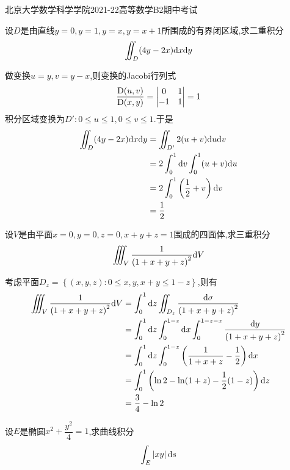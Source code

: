 \documentclass{ctexart}
\begin{document}
\pagestyle{empty}
\begin{center}\Large
    北京大学数学科学学院2021-22高等数学B2期中考试
\end{center}
\begin{problem}[1.(10\songti{分})]
    设$D$是由直线$y=0,y=1,y=x,y=x+1$所围成的有界闭区域,求二重积分
    \[\iint_D(4y-2x)\mathrm{d} x\mathrm{d} y\]

\end{problem}
\begin{solution}
    做变换$u=y,v=y-x$,则变换的Jacobi行列式
    \[\dfrac{\text D(u,v)}{\text D(x,y)}=\begin{vmatrix}
        0&1\\-1&1
    \end{vmatrix}=1\]
    积分区域变换为$D':0\leqslant u\leqslant 1,0\leqslant v\leqslant 1$.于是
    \[\begin{aligned}
        \iint_D(4y-2x)\mathrm{d} x\mathrm{d} y
        &= \iint_{D'}2(u+v)\mathrm{d} u\mathrm{d} v \\
        &= 2\int_0^1\mathrm{d} v\int_0^1(u+v)\mathrm{d} u \\
        &= 2\int_0^1\left(\dfrac12+v\right)\mathrm{d} v \\
        &= \dfrac12
    \end{aligned}\]
\end{solution}
\begin{problem}[2.(10\songti{分})]
    设$V$是由平面$x=0,y=0,z=0,x+y+z=1$围成的四面体,求三重积分
    \[\iiint_V\dfrac{1}{\left(1+x+y+z\right)^2}\mathrm{d} V\]
    
\end{problem}
\begin{solution}
    考虑平面$D_z=\left\{(x,y,z):0\leqslant x,y,x+y\leqslant 1-z\right\}$,则有
    \[\begin{aligned}
        \iiint_V\dfrac{1}{\left(1+x+y+z\right)^2}\mathrm{d} V
        &= \int_0^1\mathrm{d} z\iint_{D_z}\dfrac{\mathrm{d}\sigma}{\left(1+x+y+z\right)^2} \\
        &= \int_0^1\mathrm{d} z\int_0^{1-z}\mathrm{d} x\int_0^{1-z-x}\dfrac{\mathrm{d} y}{\left(1+x+y+z\right)^2} \\
        &= \int_0^1\mathrm{d} z\int_0^{1-z}\left(\dfrac{1}{1+x+z}-\dfrac12\right)\mathrm{d} x \\
        &= \int_0^1\left(\ln 2-\ln(1+z)-\dfrac12(1-z)\right)\mathrm{d} z \\
        &= \dfrac34-\ln2
    \end{aligned}\]

\end{solution}
\begin{problem}[3.(10\songti{分})]
    设$E$是椭圆$x^2+\dfrac{y^2}{4}=1$,求曲线积分
    \[\int_E\left|xy\right|\mathrm{d} s\]

\end{problem}
\end{document}
